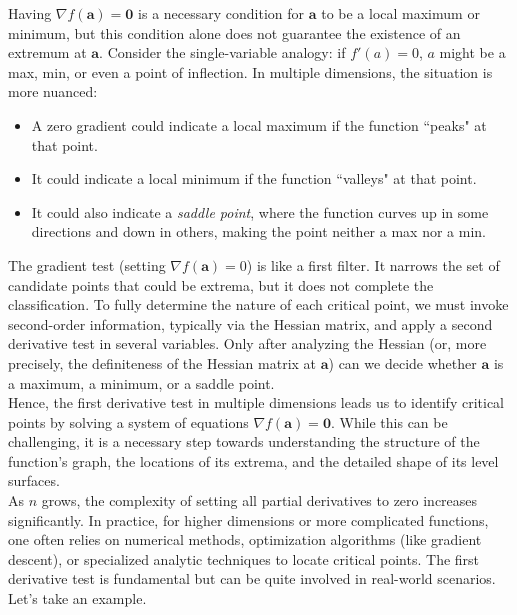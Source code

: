 \noindent Having \(\nabla f(\mathbf{a}) = \mathbf{0}\) is a necessary condition for \(\mathbf{a}\) to be a local maximum or minimum, but this condition alone does not guarantee the existence of an extremum at \(\mathbf{a}\). Consider the single-variable analogy: if \( f'(a)=0 \), \( a \) might be a max, min, or even a point of inflection. In multiple dimensions, the situation is more nuanced:
\begin{itemize}
    \item A zero gradient could indicate a local maximum if the function “peaks" at that point.
    \item It could indicate a local minimum if the function “valleys" at that point.
    \item It could also indicate a \textit{saddle point}, where the function curves up in some directions and down in others, making the point neither a max nor a min. 
\end{itemize}

\noindent The gradient test (setting \(\nabla f(\mathbf{a})=0\)) is like a first filter. It narrows the set of candidate points that could be extrema, but it does not complete the classification. To fully determine the nature of each critical point, we must invoke second-order information, typically via the Hessian matrix, and apply a second derivative test in several variables. Only after analyzing the Hessian (or, more precisely, the definiteness of the Hessian matrix at \(\mathbf{a}\)) can we decide whether \(\mathbf{a}\) is a maximum, a minimum, or a saddle point. \\

\noindent Hence, the first derivative test in multiple dimensions leads us to identify critical points by solving a system of equations \(\nabla f(\mathbf{a})=\mathbf{0}\). While this can be challenging, it is a necessary step towards understanding the structure of the function’s graph, the locations of its extrema, and the detailed shape of its level surfaces. \\

\noindent As \( n \) grows, the complexity of setting all partial derivatives to zero increases significantly. In practice, for higher dimensions or more complicated functions, one often relies on numerical methods, optimization algorithms (like gradient descent), or specialized analytic techniques to locate critical points. The first derivative test is fundamental but can be quite involved in real-world scenarios. Let's take an example.


